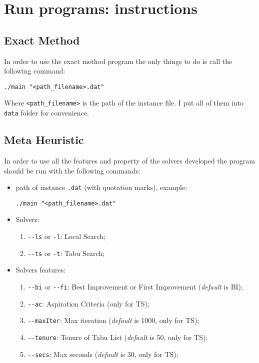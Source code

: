 \appendix
\section{Run programs: instructions}

	\subsection{Exact Method}
		In order to use the exact method program the only things to do is call the following command:
		\begin{center}
			\verb|./main "<path_filename>.dat"|
		\end{center}	
		Where \verb|<path_filename>| is the path of the instance file. I put all of them into \verb|data| folder for convenience.
	
	\subsection{Meta Heuristic}
		In order to use all the features and property of the solvers developed the program should be run with the following commands:
		
		\begin{itemize}
			\item path of instance \verb|.dat| (with quotation marks), example:
			\begin{center}
				\verb|./main "<path_filename>.dat"|
			\end{center}
			\item Solvers:
			\begin{enumerate}
				\item \verb|--ls| or \verb|-l|: Local Search;
				\item \verb|--ts| or \verb|-t|: Tabu Search;
			\end{enumerate}
			\item Solvers features:
			\begin{enumerate}
				\item \verb|--bi| or \verb|--fi|: Best Improvement or First Improvement (\textit{default} is BI);
				\item \verb|--ac|: Aspiration Criteria (only for TS);
				\item \verb|--maxIter|: Max iteration (\textit{default} is 1000, only for TS);
				\item \verb|--tenure|: Tenure of Tabu List (\textit{default} is 50, only for TS);
				\item \verb|--secs|: Max seconds (\textit{default} is 30, only for TS);
			\end{enumerate}
		\end{itemize}
	
